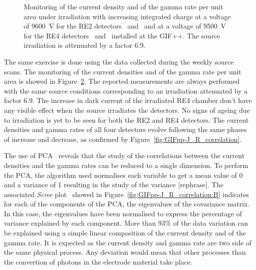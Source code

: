 \begin{figure}[H]
\begin{subfigure}{0.5\linewidth}
        	\caption{\label{fig:GIFpp-Source-mon:D}}
    	\end{subfigure}
		\caption{\label{fig:GIFpp-Source-mon} Monitoring of the current density and of the gamma rate per unit area under irradiation with increasing integrated charge at a voltage of \SI{9600}{V} for the RE2 detectors~ and~ and at a voltage of \SI{9500}{V} for the RE4 detectors~ and~ installed at the GIF++. The source irradiation is attenuated by a factor 6.9.}
	\end{figure}
	
	The same exercise is done using the data collected during the weekly source scans. The monitoring of the current densities and of the gamma rate per unit area is showed in Figure~\ref{fig:GIFpp-Source-mon}. The reported measurements are always performed with the same source conditions corresponding to an irradiation attenuated by a factor 6.9. The increase in dark current of the irradiated RE4 chamber don't have any visible effect when the source irradiates the detectors. No signs of ageing due to irradiation is yet to be seen for both the RE2 and RE4 detectors. The current densities and gamma rates of all four detectors evolve following the same phases of increase and decrease, as confirmed by Figure~\ref{fig:GIFpp-J_R_correlation}.
	
	The use of \acf{PCA}~\cite{PCA} reveals that the study of the correlations between the current densities and the gamma rates can be reduced to a single dimension. To perform the PCA, the algorithm used normalises each variable to get a mean value of 0 and a variance of 1 resulting in the study of the variance [rephrase]. The associated \textit{Scree} plot~\cite{SCREE} showed in Figure~\ref{fig:GIFpp-J_R_correlation:B} indicates for each of the components of the PCA, the eigenvalues of the covariance matrix. In this case, the eigenvalues have been normalised to express the percentage of variance explained by each component. More than 93\% of the data variation can be explained using a simple linear composition of the current density and of the gamma rate. It is expected as the current density and gamma rate are two side of the same physical process. Any deviation would mean that other processes than the convertion of photons in the electrode material take place.

